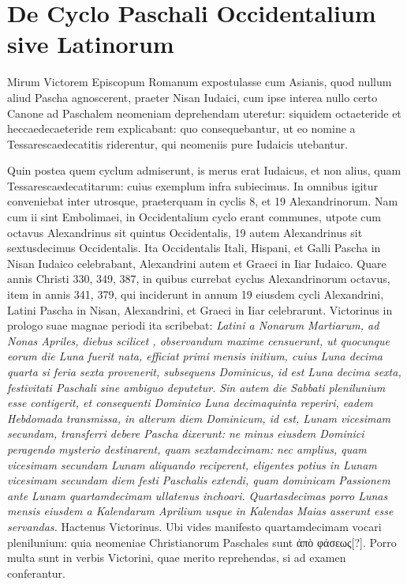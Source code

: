 \section{De Cyclo Paschali Occidentalium sive Latinorum}
%
Mirum Victorem Episcopum Romanum expostulasse cum
Asianis, quod nullum aliud Pascha agnoscerent, praeter 
Nisan Iudaici, cum ipse interea nullo certo Canone ad Paschalem
neomeniam deprehendam uteretur: siquidem octaeteride
et heccaedecaeteride rem explicabant: quo consequebantur, ut eo
nomine a Tessarescaedecatitis riderentur, qui neomeniis pure Iudaicis
utebantur.
%
\begin{table}[tb]
  
\end{table}
%
Quin postea quem cyclum admiserunt, is merus erat Iudaicus,
et non alius, quam Tessarescaedecatitarum:
cuius exemplum infra subiecimus.
In
omnibus igitur conveniebat inter utrosque,
praeterquam in cyclis 8, et 19 Alexandrinorum.
Nam cum ii sint Embolimaei, in Occidentalium
cyclo erant communes, utpote
cum octavus Alexandrinus sit quintus Occidentalis,
19 autem Alexandrinus sit sextusdecimus
Occidentalis.
Ita Occidentalis Itali,
Hispani, et Galli Pascha in Nisan Iudaico celebrabant,
Alexandrini autem et Graeci in
Iiar Iudaico.
Quare annis Christi 330, 349,
387, in quibus currebat cyclus Alexandrinorum
octavus, item in annis 341, 379, qui inciderunt
in annum 19 eiusdem cycli Alexandrini,
Latini Pascha in Nisan, Alexandrini, et Graeci in Iiar celebrarunt.
%
Victorinus in prologo suae magnae periodi ita scribebat:
 \textit{Latini
a  Nonarum Martiarum, ad  Nonas Apriles, diebus scilicet
, observandum maxime censuerunt, ut quocunque eorum
die Luna fuerit nata, efficiat primi mensis initium, cuius Luna decima
quarta si feria sexta provenerit, subsequens Dominicus, id est Luna
decima sexta, festivitati Paschali sine ambiguo deputetur.}
\textit{Sin autem
die Sabbati plenilunium esse contigerit, et consequenti Dominico
Luna decimaquinta reperiri, eadem Hebdomada transmissa, in alterum
diem Dominicum, id est, Lunam vicesimam secundam, transferri
debere Pascha dixerunt: ne minus eiusdem Dominici peragendo
mysterio destinarent, quam sextamdecimam: nec amplius, quam
vicesimam secundam Lunam aliquando reciperent, eligentes potius in
Lunam vicesimam secundam diem festi Paschalis extendi, quam dominicam
Passionem ante Lunam quartamdecimam ullatenus inchoari.}
\textit{Quartasdecimas porro Lunas mensis eiusdem a
  Kalendarum Aprilium
usque in  Kalendas Maias asserunt esse servandas.}
Hactenus
Victorinus.
Ubi vides manifesto quartamdecimam vocari plenilunium:
quia neomeniae Christianorum Paschales sunt \textgreek{ἀπὸ φάσεως[?]}.
Porro multa sunt in verbis Victorini, quae merito reprehendas, si ad
examen conferantur.
%
